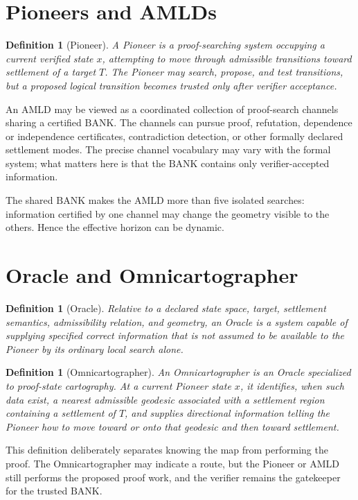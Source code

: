 \documentclass[11pt]{article}
\newtheorem{definition}[theorem]{Definition}
\newcommand{\BANK}{\mathrm{BANK}}
\begin{document}
\section{Pioneers and AMLDs}
\begin{definition}[Pioneer]
A Pioneer is a proof-searching system occupying a current verified state $x$, attempting to move through admissible transitions toward settlement of a target $T$. The Pioneer may search, propose, and test transitions, but a proposed logical transition becomes trusted only after verifier acceptance.
\end{definition}

An AMLD may be viewed as a coordinated collection of proof-search channels sharing a certified $\BANK$. The channels can pursue proof, refutation, dependence or independence certificates, contradiction detection, or other formally declared settlement modes. The precise channel vocabulary may vary with the formal system; what matters here is that the $\BANK$ contains only verifier-accepted information.

The shared $\BANK$ makes the AMLD more than five isolated searches: information certified by one channel may change the geometry visible to the others. Hence the effective horizon can be dynamic.

\section{Oracle and Omnicartographer}
\begin{definition}[Oracle]
Relative to a declared state space, target, settlement semantics, admissibility relation, and geometry, an Oracle is a system capable of supplying specified correct information that is not assumed to be available to the Pioneer by its ordinary local search alone.
\end{definition}

\begin{definition}[Omnicartographer]
An Omnicartographer is an Oracle specialized to proof-state cartography. At a current Pioneer state $x$, it identifies, when such data exist, a nearest admissible geodesic associated with a settlement region containing a settlement of $T$, and supplies directional information telling the Pioneer how to move toward or onto that geodesic and then toward settlement.
\end{definition}

This definition deliberately separates knowing the map from performing the proof. The Omnicartographer may indicate a route, but the Pioneer or AMLD still performs the proposed proof work, and the verifier remains the gatekeeper for the trusted $\BANK$.
\end{document}
